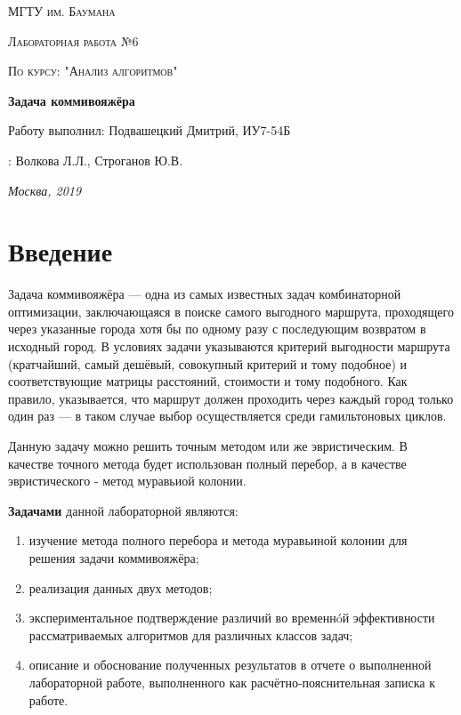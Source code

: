 \documentclass[12pt]{report}
\begin{document}
	
	
	\begin{titlepage}
		\centering
		{\scshape\LARGE МГТУ им. Баумана \par}
		\vspace{3cm}
		{\scshape\Large Лабораторная работа №6\par}
		\vspace{0.5cm}	
		{\scshape\Large По курсу: "Анализ алгоритмов"\par}
		\vspace{1.5cm}
		{\huge\bfseries Задача коммивояжёра\par}
		\vspace{2cm}
		\Large Работу выполнил: Подвашецкий Дмитрий, ИУ7-54Б\par
		\vspace{0.5cm}
		:  Волкова Л.Л., Строганов Ю.В.\par
		
		\vfill
		\large \textit {Москва, 2019} \par
	\end{titlepage}
	
	\tableofcontents
	
	\newpage
	\chapter*{Введение}
	
	Задача коммивояжёра — одна из самых известных задач комбинаторной оптимизации, заключающаяся в поиске самого выгодного маршрута, проходящего через указанные города хотя бы по одному разу с последующим возвратом в исходный город. В условиях задачи указываются критерий выгодности маршрута (кратчайший, самый дешёвый, совокупный критерий и тому подобное) и соответствующие матрицы расстояний, стоимости и тому подобного. Как правило, указывается, что маршрут должен проходить через каждый город только один раз — в таком случае выбор осуществляется среди гамильтоновых циклов.
	
	Данную задачу можно решить точным методом или же эвристическим. В качестве точного метода будет использован полный перебор, а в качестве эвристического - метод муравьиой колонии.
	
	\textbf{Задачами} данной лабораторной являются:
	\begin{enumerate}
		\item изучение метода полного перебора и метода муравьиной колонии для решения задачи коммивояжёра;
		\item реализация данных двух методов;
		\item экспериментальное подтверждение различий во временнóй эффективности рассматриваемых алгоритмов для различных классов задач;
		\item описание и обоснование полученных результатов в отчете о выполненной лабораторной
		работе, выполненного как расчётно-пояснительная записка к работе.
	\end{enumerate}
\end{document}
